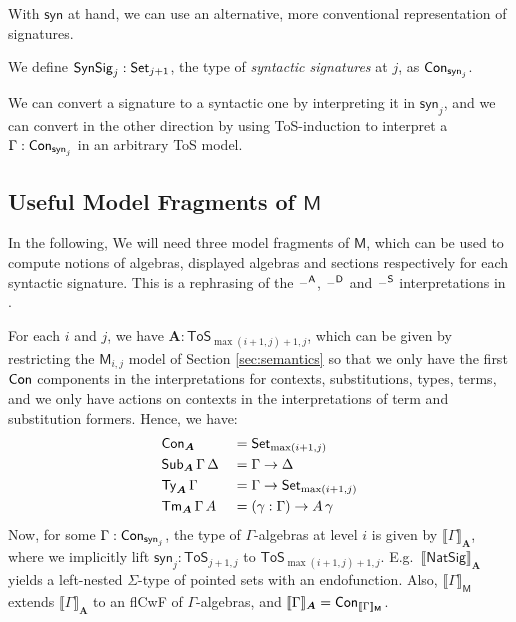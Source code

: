 \documentclass[sigplan,review,anonymous]{acmart}\settopmatter{printfolios=true,printccs=false,printacmref=false}
\newcommand{\ToS}{\mathsf{ToS}}
\newcommand{\NatSig}{\mathsf{NatSig}}
\newcommand{\syn}{\mathsf{syn}}
\newcommand{\SynSig}{\mathsf{SynSig}}
\newcommand{\bA}{\boldsymbol{A}}
\newcommand{\bM}{\boldsymbol{\mathsf{M}}}
\newcommand{\llb}{\llbracket}
\newcommand{\rrb}{\rrbracket}
\begin{document}
With $\syn$ at hand, we can use an alternative, more conventional representation of
signatures.

\begin{definition} We define $\SynSig_j : \Set_{j+1}$, the type of \emph{syntactic signatures} at $j$, as $\Con_{\syn_j}$.
\end{definition}

We can convert a signature to a syntactic one by interpreting it in $\syn_j$,
and we can convert in the other direction by using ToS-induction to interpret a
$\Gamma : \Con_{\syn_j}$ in an arbitrary ToS model.

\subsection{Useful Model Fragments of $\bM$}

In the following, We will need three model fragments of $\bM$, which can be used
to compute notions of algebras, displayed algebras and sections respectively for
each syntactic signature. This is a rephrasing of the $\mathord{\hspace{1pt}\text{--}\hspace{1pt}}^{\mathsf{A}}$,
$\mathord{\hspace{1pt}\text{--}\hspace{1pt}}^{\mathsf{D}}$ and $\mathord{\hspace{1pt}\text{--}\hspace{1pt}}^{\mathsf{S}}$ interpretations in
\cite{kaposi2019constructing}.

\begin{definition}[The $\Set$ model of $\ToS$] For each $i$ and $j$, we have $\bA : \ToS_{\max(i+1, j)+1, j}$, which can be given by restricting the $\bM_{i,j}$ model
of Section \ref{sec:semantics} so that we only have the first $\mathsf{Con}$ components
in the interpretations for contexts, substitutions, types, terms, and we only
have actions on contexts in the interpretations of term and substitution
formers. Hence, we have:
\begin{alignat*}{3}
  & \Con_{\bA} && = \Set_{\max(i+1, j)} \\
  & \Sub_{\bA}\,\Gamma\,\Delta && = \Gamma \ra \Delta\\
  & \Ty_{\bA}\,\Gamma && = \Gamma \ra \Set_{\max(i+1, j)}\\
  & \Tm_{\bA}\,\Gamma\,A && = (\gamma : \Gamma) \ra A\,\gamma
\end{alignat*}
Now, for some $\Gamma : \Con_{\syn_j}$, the type of $\Gamma$-algebras at level
$i$ is given by $\llb\Gamma\rrb_{\bA}$, where we implicitly lift $\syn_j :
\ToS_{j+1, j}$ to $\ToS_{\max(i+1,j)+1, j}$. E.g.\, $\llb\NatSig\rrb_{\bA}$
yields a left-nested $\Sigma$-type of pointed sets with an endofunction. Also,
$\llb\Gamma\rrb_{\bM}$ extends $\llb\Gamma\rrb_{\bA}$ to an flCwF of
$\Gamma$-algebras, and $\llb\Gamma\rrb_{\bA} = \Con_{\llb\Gamma\rrb_{\bM}}$.
\end{definition}
\end{document}
